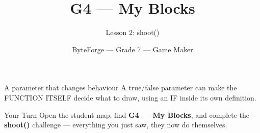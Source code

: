 \documentclass[aspectratio=169]{beamer}
\title{G4 — My Blocks}
\subtitle{Lesson 2: shoot()}
\author{ByteForge --- Grade 7 --- Game Maker}
\date{}
\begin{document}
\begin{frame}
    \titlepage
\end{frame}

\begin{frame}{A parameter that changes behaviour}
    \Large
    A true/false parameter can make the FUNCTION ITSELF decide what to draw, using an IF inside its own definition.
\end{frame}

\begin{frame}{Your Turn}
    \Large
    Open the student map, find \textbf{G4 — My Blocks}, and complete
    the \textbf{shoot()} challenge --- everything you just saw, they now do themselves.
\end{frame}
\end{document}
